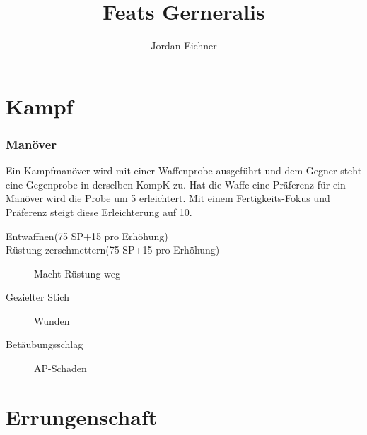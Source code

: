 \documentclass[a4paper,12pt,oneside]{book}
\author{Jordan Eichner}
\title{Feats Gerneralis}
\date{}
\begin{document}
\maketitle
\tableofcontents

\part{Kampf}

\section{Manöver}
Ein Kampfmanöver wird mit einer Waffenprobe ausgeführt und dem Gegner steht eine Gegenprobe in derselben KompK zu. Hat die Waffe eine Präferenz für ein Manöver wird die Probe um 5 erleichtert. Mit einem Fertigkeits-Fokus und Präferenz steigt diese Erleichterung auf 10.
\begin{description}
\item[Entwaffnen(75 SP+15 pro Erhöhung)]
\item[Rüstung zerschmettern(75 SP+15 pro Erhöhung)]Macht Rüstung weg
\item[Gezielter Stich]Wunden
\item[Betäubungsschlag]AP-Schaden
\end{description}

\part{Errungenschaft}
\end{document}
